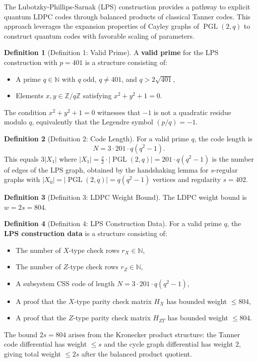 \documentclass[11pt]{article}
\theoremstyle{plain}
\theoremstyle{definition}
\newtheorem*{definition}{Definition}
\theoremstyle{remark}
\begin{document}
The Lubotzky-Phillips-Sarnak (LPS) construction provides a pathway to explicit quantum LDPC codes through balanced products of classical Tanner codes. This approach leverages the expansion properties of Cayley graphs of $\operatorname{PGL}(2,q)$ to construct quantum codes with favorable scaling of parameters.

\begin{definition}[Definition 1: Valid Prime]
A \textbf{valid prime} for the LPS construction with $p = 401$ is a structure consisting of:
\begin{itemize}
  \item A prime $q \in \mathbb{N}$ with $q$ odd, $q \neq 401$, and $q > 2\sqrt{401}$,
  \item Elements $x, y \in \mathbb{Z}/q\mathbb{Z}$ satisfying $x^2 + y^2 + 1 = 0$.
\end{itemize}
The condition $x^2 + y^2 + 1 = 0$ witnesses that $-1$ is not a quadratic residue modulo $q$, equivalently that the Legendre symbol $(p/q) = -1$.
\end{definition}

\begin{definition}[Definition 2: Code Length]
For a valid prime $q$, the code length is
\[
N = 3 \cdot 201 \cdot q(q^2 - 1).
\]
This equals $3|X_1|$ where $|X_1| = \frac{s}{2} \cdot |\operatorname{PGL}(2,q)| = 201 \cdot q(q^2-1)$ is the number of edges of the LPS graph, obtained by the handshaking lemma for $s$-regular graphs with $|X_0| = |\operatorname{PGL}(2,q)| = q(q^2-1)$ vertices and regularity $s = 402$.
\end{definition}

\begin{definition}[Definition 3: LDPC Weight Bound]
The LDPC weight bound is $w = 2s = 804$.
\end{definition}

\begin{definition}[Definition 4: LPS Construction Data]
For a valid prime $q$, the \textbf{LPS construction data} is a structure consisting of:
\begin{itemize}
  \item The number of $X$-type check rows $r_X \in \mathbb{N}$,
  \item The number of $Z$-type check rows $r_Z \in \mathbb{N}$,
  \item A subsystem CSS code of length $N = 3 \cdot 201 \cdot q(q^2-1)$,
  \item A proof that the $X$-type parity check matrix $H_X$ has bounded weight $\leq 804$,
  \item A proof that the $Z$-type parity check matrix $H_{ZT}$ has bounded weight $\leq 804$.
\end{itemize}
The bound $2s = 804$ arises from the Kronecker product structure: the Tanner code differential has weight $\leq s$ and the cycle graph differential has weight $2$, giving total weight $\leq 2s$ after the balanced product quotient.
\end{definition}
\end{document}
